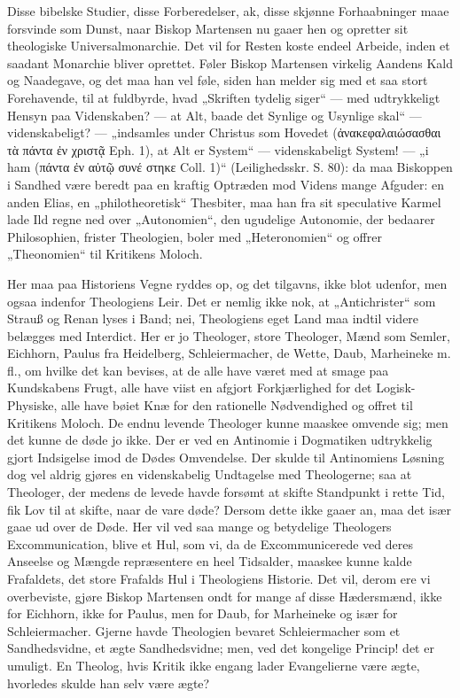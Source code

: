 \documentclass[12pt]{book}
\newcommand{\opage}[1]{\marginnote{\footnotesize\textit{[#1]}}}
\begin{document}
Disse bibelske Studier, disse Forberedelser, ak, disse
skjønne Forhaabninger maae forsvinde som Dunst, naar Biskop
Martensen nu gaaer hen og opretter sit theologiske Universalmonarchie.
Det vil for Resten koste endeel Arbeide,
inden et saadant Monarchie bliver oprettet. Føler Biskop
Martensen virkelig Aandens Kald og Naadegave, og det maa
han vel føle, siden han melder sig med et saa stort Forehavende,
til at fuldbyrde, hvad „Skriften tydelig siger“ ---
med udtrykkeligt Hensyn paa Videnskaben? --- at Alt, baade
det Synlige og Usynlige skal“ --- videnskabeligt? --- „indsamles
under Christus som Hovedet (ἀνακεφαλαιώσασθαι
τὰ πάντα ἐν χριστᾷ Eph. 1), %
at Alt er System“ ---
\opage{65}\setcounter{footnote}{0}%
videnskabeligt System! --- „i ham (πάντα ἐν αὐτῷ συνέ\-%
στηκε Coll. 1)“ (Leilighedsskr. S. 80): da maa Biskoppen
i Sandhed være beredt paa en kraftig Optræden mod Videns
mange Afguder: en anden Elias, en „philotheoretisk“ Thesbiter,
maa han fra sit speculative Karmel lade Ild regne ned
over „Autonomien“, den ugudelige Autonomie, der bedaarer
Philosophien, frister Theologien, boler med „Heteronomien“ og
offrer „Theonomien“ til Kritikens Moloch.

Her maa paa Historiens Vegne ryddes op, og det tilgavns,
ikke blot udenfor, men ogsaa indenfor Theologiens
Leir. Det er nemlig ikke nok, at „Antichrister“ som Strauß
og Renan lyses i Band; nei, Theologiens eget Land maa
indtil videre belægges med Interdict. Her er jo Theologer,
store Theologer, Mænd som Semler, Eichhorn, Paulus fra
Heidelberg, Schleiermacher, de Wette, Daub, Marheineke
m. fl., om hvilke det kan bevises, at de alle have været med
at smage paa Kundskabens Frugt, alle have viist en afgjort
Forkjærlighed for det Logisk-Physiske, alle have bøiet Knæ for
den rationelle Nødvendighed og offret til Kritikens Moloch.
De endnu levende Theologer kunne maaskee omvende sig; men
det kunne de døde jo ikke. Der er ved en Antinomie i Dogmatiken
udtrykkelig gjort Indsigelse imod de Dødes Omvendelse.
Der skulde til Antinomiens Løsning dog vel aldrig
gjøres en videnskabelig Undtagelse med Theologerne; saa at
Theologer, der medens de levede havde forsømt at skifte Standpunkt
i rette Tid, fik Lov til at skifte, naar de vare døde? Dersom
dette ikke gaaer an, maa det især gaae ud over de Døde. Her
vil ved saa mange og betydelige Theologers Excommunication,
blive et Hul, som vi, da de Excommunicerede ved deres Anseelse
og Mængde repræsentere en heel Tidsalder, maaskee kunne
kalde Frafaldets, det store Frafalds Hul i Theologiens Historie.
Det vil, derom ere vi overbeviste, gjøre Biskop
Martensen ondt for mange af disse Hædersmænd, ikke for
Eichhorn, ikke for Paulus, men for Daub, for Marheineke
\opage{66}\setcounter{footnote}{0}%
og især for Schleiermacher. Gjerne havde Theologien bevaret
Schleiermacher som et Sandhedsvidne, et ægte Sandhedsvidne;
men, ved det kongelige Princip! det er umuligt.
En Theolog, hvis Kritik ikke engang lader Evangelierne være
ægte, hvorledes skulde han selv være ægte?
\end{document}
